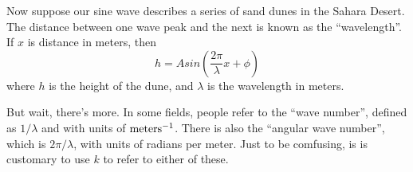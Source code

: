Now suppose our sine wave describes a series of sand dunes in the Sahara
Desert. The distance between one wave peak and the next is known as the
``wavelength''. If $x$ is distance in meters, then
\begin{equation}
h = A sin(\frac{2\pi}{\lambda}x + \phi)
\end{equation}
where $h$ is the height of the dune, and
$\lambda$ is the wavelength in meters.

But wait, there's more. In some fields, people refer to the
``wave number'', defined as $1/\lambda$ and with units of 
${\rm meters}^{-1}$. There is also the ``angular wave number'', which is
$2\pi/\lambda$, with units of radians per meter. Just to be comfusing,
is is customary to use $k$ to refer to either of these.